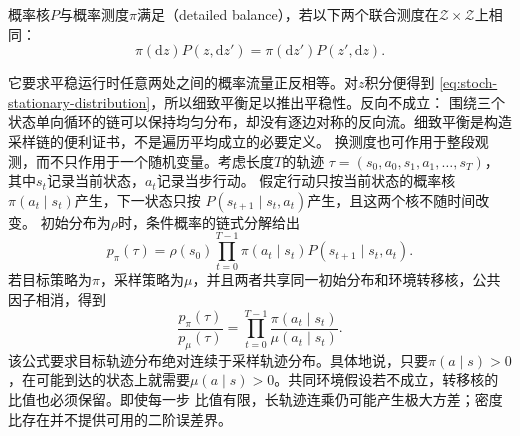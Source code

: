 \begin{definition}[细致平衡]
  \label{def:stoch-detailed-balance}
概率核\(P\)与概率测度\(\pi\)满足（detailed balance），若以下两个联合测度在\(\mathcal Z\times\mathcal Z\)上相同：
\begin{equation}
  \pi(\mathrm{d}z)P(z,\mathrm{d}z')
  =\pi(\mathrm{d}z')P(z',\mathrm{d}z).
  \label{eq:stoch-detailed-balance}
\end{equation}
\end{definition}
它要求平稳运行时任意两处之间的概率流量正反相等。对$z$积分便得到
\eqref{eq:stoch-stationary-distribution}，所以细致平衡足以推出平稳性。反向不成立：
围绕三个状态单向循环的链可以保持均匀分布，却没有逐边对称的反向流。细致平衡是构造
采样链的便利证书，不是遍历平均成立的必要定义。
换测度也可作用于整段观测，而不只作用于一个随机变量。考虑长度\(T\)的轨迹
\(\tau=(s_0,a_0,s_1,a_1,\ldots,s_T)\)，其中\(s_t\)记录当前状态，\(a_t\)记录当步行动。
假定行动只按当前状态的概率核\(\pi(a_t\mid s_t)\)产生，下一状态只按
\(P(s_{t+1}\mid s_t,a_t)\)产生，且这两个核不随时间改变。
初始分布为\(\rho\)时，条件概率的链式分解给出
\[ p_\pi(\tau)
  =\rho(s_0)\prod_{t=0}^{T-1}\pi(a_t\mid s_t)P(s_{t+1}\mid s_t,a_t). \]
若目标策略为\(\pi\)，采样策略为\(\mu\)，并且两者共享同一初始分布和环境转移核，公共因子相消，得到
\begin{equation}
  \frac{p_\pi(\tau)}{p_\mu(\tau)}
  =
  \prod_{t=0}^{T-1}
  \frac{\pi(a_t\mid s_t)}{\mu(a_t\mid s_t)}.
  \label{eq:probability-trajectory-likelihood-ratio}
\end{equation}
该公式要求目标轨迹分布绝对连续于采样轨迹分布。具体地说，只要\(\pi(a\mid s)>0\)，在可能到达的状态上就需要\(\mu(a\mid s)>0\)。共同环境假设若不成立，转移核的比值也必须保留。即使每一步
比值有限，长轨迹连乘仍可能产生极大方差；密度比存在并不提供可用的二阶误差界。

